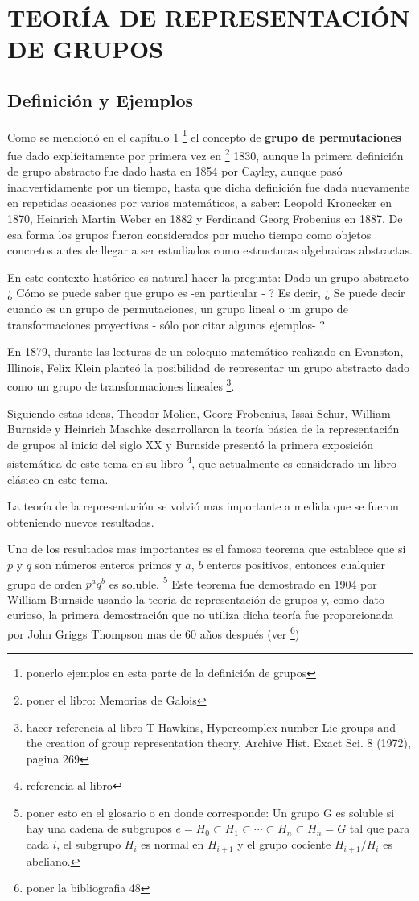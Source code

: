 \chapter{TEORÍA DE REPRESENTACIÓN DE GRUPOS}

\section{Definición y Ejemplos}

Como se mencionó en el capítulo 1 \footnote{ponerlo ejemplos en esta parte de la definición de grupos} el concepto de \textbf{grupo de permutaciones} fue dado explícitamente por primera vez en \footnote{poner el libro: Memorias de Galois} 1830, aunque la primera definición de grupo abstracto fue dado hasta en 1854 por Cayley, aunque pasó inadvertidamente por un tiempo, hasta que dicha definición fue dada nuevamente en repetidas ocasiones por varios matemáticos, a saber: Leopold Kronecker en 1870, Heinrich Martin Weber en 1882 y Ferdinand Georg Frobenius en 1887. De esa forma los grupos fueron considerados por mucho tiempo como objetos concretos antes de llegar a ser estudiados como estructuras algebraicas abstractas.

En este contexto histórico es natural hacer la pregunta: Dado un grupo abstracto ¿ Cómo se puede saber que grupo es -en  particular - ? Es decir, ¿ Se puede decir cuando es un grupo de permutaciones, un grupo lineal o un grupo de transformaciones proyectivas  - sólo por citar algunos ejemplos- ?

En 1879, durante las lecturas de un coloquio matemático realizado en Evanston, Illinois, Felix Klein planteó la posibilidad de representar un grupo abstracto dado como un grupo de transformaciones lineales \footnote{hacer referencia al libro T Hawkins, Hypercomplex number Lie groups and the creation of group representation theory, Archive Hist. Exact Sci. 8 (1972), pagina 269}.

Siguiendo estas ideas, Theodor Molien, Georg Frobenius, Issai Schur, William Burnside y  Heinrich Maschke desarrollaron la teoría básica de la representación de grupos al inicio del siglo XX y Burnside presentó la primera exposición  sistemática de este tema en su libro \footnote{referencia al libro}, que actualmente es considerado un libro clásico en este tema. 

La teoría de la representación se volvió mas importante a medida que se fueron obteniendo nuevos resultados.

Uno de los resultados mas importantes es el famoso teorema que establece que si $p$ y $q$ son números enteros primos y  $a$, $b$ enteros positivos, entonces cualquier grupo de orden $p^aq^b$ es soluble. \footnote{poner esto en el glosario o en donde corresponde: Un grupo G es soluble si hay una cadena de subgrupos ${e} = H_0 \subset H_1 \subset \cdots \subset H_n \subset H_n = G$ tal que para cada $i$, el subgrupo $H_i$ es normal en $H_{i+1}$ y el grupo cociente $H_{i+1}/H_i$ es abeliano.} Este teorema fue demostrado en 1904 por William Burnside usando la teoría de representación de grupos y, como dato curioso, la primera demostración que no utiliza dicha teoría fue proporcionada por John Griggs Thompson mas de 60 años después (ver \footnote{poner la bibliografia 48})


